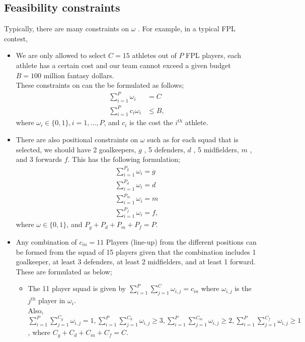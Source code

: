 				\subsection{Feasibility constraints}
					Typically, there are many constraints on $\omega$ . For example, in a typical FPL contest,
					\begin{itemize}
						\item We are only allowed to select $C = 15$ athletes out of $P$ FPL players, each athlete has a certain cost and our team cannot exceed a given budget $B=100$ million fantasy dollars.\\
						These constraints on  can the be formulated as follows;
						\[
						\begin{aligned}
							\sum_{i=1}^{P}\omega_i &=C\\
							\sum_{i=1}^{P}c_i\omega_{i} &\le B,
						\end{aligned}
						\]
						where $\omega_{i} \in \{0,1\}, i = 1, ..., P$, and $c_i$ is the cost the $i^{th}$ athlete.
						\item There are also positional constraints on $\omega$ such as for each squad that is selected, we should have 2 goalkeepers, $g$ , 5 defenders, $d$ , 5 midfielders, $m$ , and 3 forwards $f$. This has the following formulation;
						\[
						\begin{aligned}
							\sum_{i=1}^{P_g}\omega_{i} =g\\
							\sum_{i=1}^{P_d}\omega_{i} =d\\
							\sum_{i=1}^{P_m}\omega_{i} =m\\
							\sum_{i=1}^{P_f}\omega_{i} =f,
						\end{aligned}
						\]
						where $\omega \in \{0,1\}$, and $P_g+P_d+P_m+P_f=P$.
						\item Any combination of $c_{in}=11$ Players (line-up) from the different positions can be formed from the squad of 15 players given that the combination includes 1 goalkeeper, at least 3 defenders, at least 2 midfielders, and at least 1 forward. These are formulated as below;
						\begin{itemize}
							\item The 11 player squad is given by $\sum_{i=1}^{P}\sum_{j=1}^{C}\omega_{i,j} = c_{in}$ where $\omega_{i,j}$ is the $j^{th}$ player in $\omega_{i}$.\\
							Also, $\sum_{i=1}^{P}\sum_{j=1}^{C_g}\omega_{i,j} = 1, \sum_{i=1}^{P}\sum_{j=1}^{C_d}\omega_{i,j} \ge 3, \sum_{i=1}^{P}\sum_{j=1}^{C_m}\omega_{i,j} \ge 2, \sum_{i=1}^{P}\sum_{j=1}^{C_f}\omega_{i,j} \ge 1$, where $C_g+C_d+C_m+C_f = C$.
						\end{itemize}

					\end{itemize}

